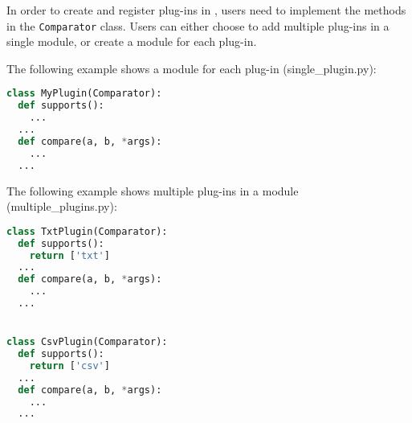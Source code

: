In order to create and register plug-ins in \systemname, users
need to implement the methods in the \texttt{Comparator} class.
Users can either choose to add multiple plug-ins in a single
module, or create a module for each plug-in.

The following example shows a module for each plug-in (single\_plugin.py):
\begin{lstlisting}[language = python]
class MyPlugin(Comparator):
  def supports():
    ...
  ...
  def compare(a, b, *args):
    ...
  ...
\end{lstlisting}


The following example shows multiple plug-ins in a module (multiple\_plugins.py):
\begin{lstlisting}[language = python]
class TxtPlugin(Comparator):
  def supports():
    return ['txt']
  ...
  def compare(a, b, *args):
    ...
  ...


class CsvPlugin(Comparator):
  def supports():
    return ['csv']
  ...
  def compare(a, b, *args):
    ...
  ...
\end{lstlisting}

